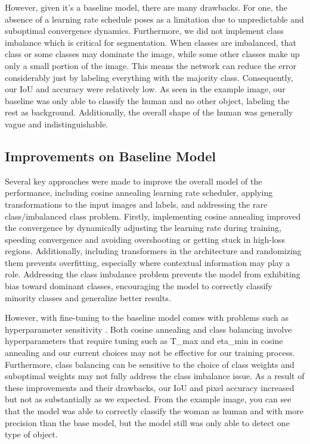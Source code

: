 \documentclass{article}
\begin{document}
However, given it's a baseline model, there are many drawbacks. For one, the absence of a learning rate schedule poses as a limitation due to unpredictable and suboptimal convergence dynamics. Furthermore, we did not implement class imbalance which is critical for segmentation. When classes are imbalanced, that class or some classes may dominate the image, while some other classes make up only a small portion of the image. This means the network can reduce the error considerably just by labeling everything with the majority class. Consequently, our IoU and accuracy were relatively low. As seen in the example image, our baseline was only able to classify the human and no other object, labeling the rest as background. Additionally, the overall shape of the human was generally vague and indistinguishable.
\subsection{Improvements on Baseline Model}
Several key approaches were made to improve the overall model of the performance, including cosine annealing learning rate scheduler, applying transformations to the input images and labels, and addressing the rare class/imbalanced class problem. Firstly, implementing cosine annealing improved the convergence by dynamically adjusting the learning rate during training, speeding convergence and avoiding overshooting or getting  stuck in high-loss regions. Additionally, including transformers in the architecture and randomizing them prevents overfitting, especially where contextual information may play a role. Addressing the class imbalance problem prevents the model from exhibiting bias toward dominant classes, encouraging the model to correctly classify minority classes and generalize better results. 

However, with fine-tuning to the baseline model comes with problems such as hyperparameter sensitivity . Both cosine annealing and class balancing involve hyperparameters that require tuning such as T\_max and eta\_min in cosine annealing and our current choices may not be effective for our training process. Furthermore, class balancing can be sensitive to the choice of class weights and suboptimal weights may not fully address the class imbalance issue. As a result of these improvements and their drawbacks, our IoU and pixel accuracy increased but not as substantially as we expected. From the example image, you can see that the model was able to correctly classify the woman as human and with more precision than the base model, but the model still was only able to detect one type of object.
\end{document}

